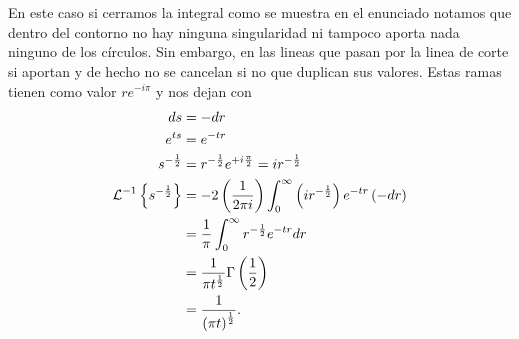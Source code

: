 \documentclass{report}
\begin{document}
\chapter{}

En este caso si cerramos la integral como se muestra en el enunciado notamos que dentro del contorno no hay ninguna singularidad ni tampoco aporta nada ninguno de los círculos. Sin embargo, en las lineas que pasan por la linea de corte si aportan y de hecho no se cancelan si no que duplican sus valores. Estas ramas tienen como valor $re^{-i \pi}$ y nos dejan con
\begin{align*}
  ds &= -dr\\
  e^{ts}&= e^{-tr} \\
  s^{-\frac{1}{2}} &= r^{-\frac{1}{2}}e^{+i \frac{\pi}{2}} = ir^{- \frac{1}{2}} \\
  \operatorname{\mathcal{L}}^{-1}\left\{ s^{-\frac{1}{2}} \right\} &= -2 \left( \frac{1}{2\pi i} \right) \int_{0}^{\infty} \left( ir^{-\frac{1}{2}} \right) e^{-tr}\left( -dr \right) \\
  &= \frac{1}{\pi}\int_{0}^{\infty} r^{-\frac{1}{2}}e^{-tr}dr \\
  &= \frac{1}{\pi t^{\frac{1}{2}}}\Gamma\left( \frac{1}{2} \right)  \\
  &= \frac{1}{\left( \pi t \right)^{\frac{1}{2}}}
.\end{align*}
\end{document}
